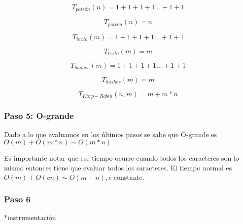 \[T_{patrón}(n) = 1 + 1 + 1 + 1 ... + 1 + 1\]

\[T_{patrón}(n) = n \]

\[T_{texto}(m) = 1 + 1 + 1 + 1 ... + 1 + 1\]

\[T_{texto}(m) = m \]

\[T_{hashes}(m) = 1 + 1 + 1 + 1 ... + 1 + 1\]

\[T_{hashes}(m) = m \]

\[T_{Karp-Rabin}(n,m) = m + m * n\]

\subsubsection*{Paso 5: O-grande}

Dado a lo que evaluamos en los últimos pasos se sabe que O-grande es $O(m) + O(m*n) \sim O(m*n)$

Es importante notar que ese tiempo ocurre cuando todos los caracteres son lo mismo entonces tiene que evaluar todos los caracteres. El tiempo normal es $O(m) + O(cn) \sim O(m+n), c$ constante.


\subsubsection*{Paso 6}
*instrumentación